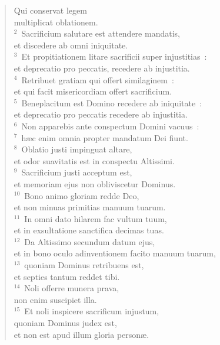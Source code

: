 \begin{flushleft}\begin{verse}\vspace{-19pt}\hspace{6pt}Qui conservat legem\\\hspace{6pt} multiplicat oblationem.\\
${}^{2}$~Sacrificium salutare est attendere mandatis,\\ et discedere ab omni iniquitate.\\
${}^{3}$~Et propitiationem litare sacrificii super injustitias~:\\ et deprecatio pro peccatis, recedere ab injustitia.\\
${}^{4}$~Retribuet gratiam qui offert similaginem~:\\ et qui facit misericordiam offert sacrificium.\\
${}^{5}$~Beneplacitum est Domino recedere ab iniquitate~:\\ et deprecatio pro peccatis recedere ab injustitia.\\
${}^{6}$~Non apparebis ante conspectum Domini vacuus~:\\
${}^{7}$~h\ae c enim omnia propter mandatum Dei fiunt.\\
${}^{8}$~Oblatio justi impinguat altare,\\ et odor suavitatis est in conspectu Altissimi.\\
${}^{9}$~Sacrificium justi acceptum est,\\ et memoriam ejus non obliviscetur Dominus.\\
${}^{10}$~Bono animo gloriam redde Deo,\\ et non minuas primitias manuum tuarum.\\
${}^{11}$~In omni dato hilarem fac vultum tuum,\\ et in exsultatione sanctifica decimas tuas.\\
${}^{12}$~Da Altissimo secundum datum ejus,\\ et in bono oculo adinventionem facito manuum tuarum,\\
${}^{13}$~quoniam Dominus retribuens est,\\ et septies tantum reddet tibi.\\
${}^{14}$~Noli offerre munera prava,\\ non enim suscipiet illa.\\
${}^{15}$~Et noli inspicere sacrificum injustum,\\ quoniam Dominus judex est,\\ et non est apud illum gloria person\ae .\\

\end{verse}
\end{flushleft}
